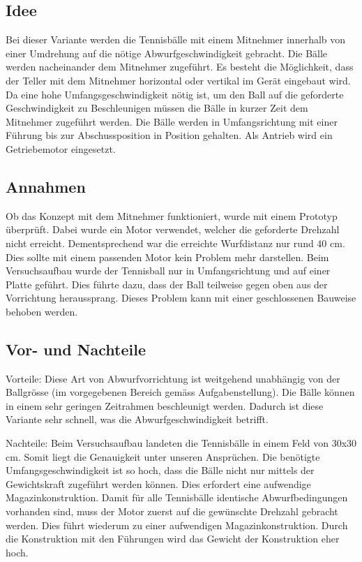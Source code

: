 \subsection{Idee}
Bei dieser Variante werden die Tennisbälle mit einem Mitnehmer innerhalb von einer Umdrehung auf die nötige Abwurfgeschwindigkeit gebracht. Die Bälle werden nacheinander dem Mitnehmer zugeführt. Es besteht die Möglichkeit, dass der Teller mit dem Mitnehmer horizontal oder vertikal im Gerät eingebaut wird. Da eine hohe Umfangsgeschwindigkeit nötig ist, um den Ball auf die geforderte Geschwindigkeit zu Beschleunigen müssen die Bälle in kurzer Zeit dem Mitnehmer zugeführt werden. Die Bälle werden in Umfangsrichtung mit einer Führung bis zur Abschussposition in Position gehalten. Als Antrieb wird ein Getriebemotor eingesetzt.  

\subsection{Annahmen}
Ob das Konzept mit dem Mitnehmer funktioniert, wurde mit einem Prototyp überprüft. Dabei wurde ein Motor verwendet, welcher die geforderte Drehzahl nicht erreicht. Dementsprechend war die erreichte Wurfdistanz nur rund 40 cm. Dies sollte mit einem passenden Motor kein Problem mehr darstellen. Beim Versuchsaufbau wurde der Tennisball nur in Umfangsrichtung und auf einer Platte geführt. Dies führte dazu, dass der Ball teilweise gegen oben aus der Vorrichtung heraussprang. Dieses Problem kann mit einer geschlossenen Bauweise behoben werden.   

\subsection{Vor- und Nachteile}

Vorteile: Diese Art von Abwurfvorrichtung ist weitgehend unabhängig von der Ballgrösse (im vorgegebenen Bereich gemäss Aufgabenstellung). Die Bälle können in einem sehr geringen Zeitrahmen beschleunigt werden. Dadurch ist diese Variante sehr schnell, was die Abwurfgeschwindigkeit betrifft.   

Nachteile: Beim Versuchsaufbau landeten die Tennisbälle in einem Feld von 30x30 cm. Somit liegt die Genauigkeit unter unseren Ansprüchen. Die benötigte Umfangsgeschwindigkeit ist so hoch, dass die Bälle nicht nur mittels der Gewichtskraft zugeführt werden können. Dies erfordert eine aufwendige Magazinkonstruktion. Damit für alle Tennisbälle identische Abwurfbedingungen vorhanden sind, muss der Motor zuerst auf die gewünschte Drehzahl gebracht werden. Dies führt wiederum zu einer aufwendigen Magazinkonstruktion. Durch die Konstruktion mit den Führungen wird das Gewicht der Konstruktion eher hoch.  
